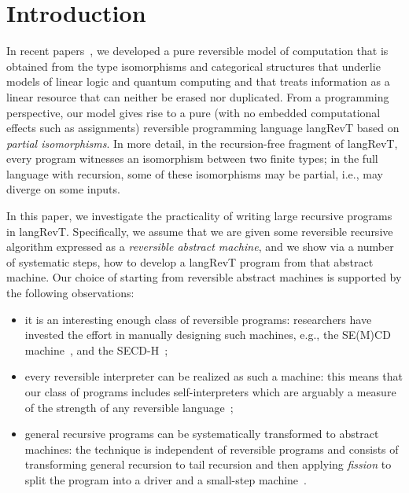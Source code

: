 \documentclass{llncs}
\begin{document}
\section{Introduction} 

In recent papers~\cite{rc2011,James:2012:IE:2103656.2103667}, we developed a
pure reversible model of computation that is obtained from the type
isomorphisms and categorical structures that underlie models of linear logic
and quantum computing and that treats information as a linear resource that
can neither be erased nor duplicated. From a programming perspective, our
model gives rise to a pure (with no embedded computational effects such as
assignments) reversible programming language {{langRevT}} based on
\emph{partial isomorphisms}. In more detail, in the recursion-free fragment
of {{langRevT}}, every program witnesses an isomorphism between two finite
types; in the full language with recursion, some of these isomorphisms may be
partial, i.e., may diverge on some inputs. 

In this paper, we investigate the practicality of writing large recursive programs
in {{langRevT}}. Specifically, we assume that we are given some reversible
recursive algorithm expressed as a \emph{reversible abstract machine}, and we
show via a number of systematic steps, how to develop a {{langRevT}} program
from that abstract machine. Our choice of starting from reversible abstract
machines is supported by the following observations:
\begin{itemize}
\item it is an interesting enough class of reversible programs: researchers
  have invested the effort in manually designing such machines, e.g., the
  SE(M)CD machine~\cite{Kluge:1999:SEMCD}, and the SECD-H~\cite{lorenz};
\item every reversible interpreter can be realized as such a machine: this
  means that our class of programs includes self-interpreters which are
  arguably a measure of the strength of any reversible
  language~\cite{Axelsen:2011:RPC:1987171.1987176,Yokoyama:2008:PRP,Yokoyama:2007:RPL:1244381.1244404};
\item general recursive programs can be systematically transformed to
  abstract machines: the technique is independent of reversible programs and
  consists of transforming general recursion to tail recursion and then
  applying \emph{fission} to split the program into a driver and a small-step
  machine~\cite{Danvy:2008:RRN:1813347.1813350,Rendel:2010:ISD:1863523.1863525}.
\end{itemize}
\end{document}
